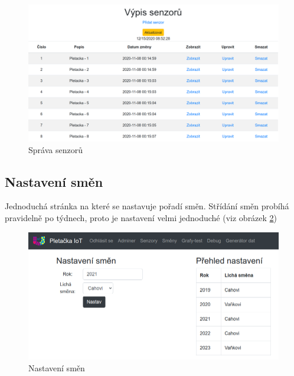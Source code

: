
\begin{figure}[htbp]
    \centering
    \includegraphics[width=\textwidth]{img/Edit.png}
    \caption{Správa senzorů}
    \label{fig:webSpravaSenzoru}
\end{figure}

\subsection{Nastavení směn}
Jednoduchá stránka na které se nastavuje pořadí směn.
Střídání směn probíhá pravidelně po týdnech, proto je nastavení velmi jednoduché (viz obrázek \ref{fig:webSmeny})

\begin{figure}[htbp]
    \centering
    \includegraphics[width=\textwidth]{img/smeny.png}
    \caption{Nastavení směn}
    \label{fig:webSmeny}
\end{figure}

